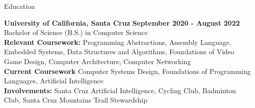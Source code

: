\documentclass{resume}
\begin{document}
\begin{rSection}{\large Education}

{\bf University of California, Santa Cruz} \hfill {\bf{September 2020 - August 2022}}
\\ Bachelor of Science (B.S.) in Computer Science\hfill %
\\ \textbf{Relevant Coursework:} Programming Abstractions, Assembly Language, Embedded Systems, Data Structures and Algorithms, Foundations of Video Game Design, Computer Architecture, Computer Networking
\\ \textbf{Current Coursework} Computer Systems Design, Foundations of Programming Languages, Artificial Intelligence 
\\ \textbf{Involvements:}  Santa Cruz Artificial Intelligence, Cycling Club, Badminton Club, Santa Cruz Mountains Trail Stewardship 

\end{rSection}
\end{document}
